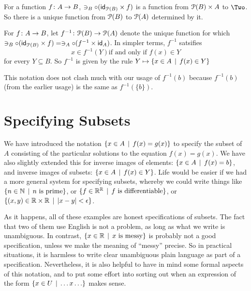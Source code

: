 For a function ${f}\colon{A}\to{B}$, $\ni_B\circ (\textsf{id}_{{\mathcal{P}}(B)}\times f)$ is a function from ${\mathcal{P}}(B)\times A$ to $\Two$. So there is a unique function
from ${\mathcal{P}}(B)$ to ${\mathcal{P}}(A)$ determined by it. 

\begin{defn}
	For ${f}\colon{A}\to{B}$, let ${f^{-1}}\colon{{\mathcal{P}}(B)}\to{{\mathcal{P}}(A)}$ denote
	the unique function for which $\ni_B\circ (\textsf{id}_{{\mathcal{P}}(B)}\times f) = \ni_A\circ(f^{-1}\times \textsf{id}_A)$. In simpler terms, $f^{-1}$ satsifies
\[x\in f^{-1}(Y) \text{if and only if } f(x)\in Y\]
for every $Y\subseteq B$.  So $f^{-1}$ is given by the rule $Y\mapsto \{x\in A\,\mid\, f(x)\in Y\}$
\end{defn}

This notation does not clash much with our usage of $f^{-1}(b)$ because 
$f^{-1}(b)$ (from the earlier usage) is the same as $f^{-1}(\{b\})$.

\section{Specifying Subsets}

We have introduced the notation $\{x\in A\,\mid\, f(x)=g(x)\}$ to specify the subset of $A$ consisting of the particular solutions to the equation $f(x)=g(x)$. 
We have also slightly extended this for inverse images of elements: $\{x\in A \,\mid\, f(x)=b\}$, and inverse images of subsets: $\{x\in A\,\mid\, f(x)\in Y\}$. 
Life would be easier if we had a more general system for specifying subsets, whereby we could write things like $\{n\in \mathbb N \,\mid\, \text{$n$ is prime}\}$, or $\{f\in \mathbb R^\mathbb R\,\mid\, \text{$f$ is differentiable}\}$, or $\{(x,y)\in \mathbb R\times \mathbb R\,\mid\, |x-y| < \epsilon\}$. 

As it happens, all of these examples are honest specifications of subsets. 
The fact that two of them use English is not a problem, as long as what we write is unambiguous. 
In contrast, $\{x\in \mathbb R\,\mid\, \text{$x$ is messy}\}$ is probably not a good specification, unless we make the meaning of ``messy'' precise. 
So in practical situations, it is harmless to write clear unambiguous plain language as part of a specification. 
Nevertheless, it is also helpful to have in mind some formal aspects of this notation, and to put some effort into sorting out when an expression of the form
$\{x\in U\,\mid\, \ldots x \ldots\}$ makes sense.

